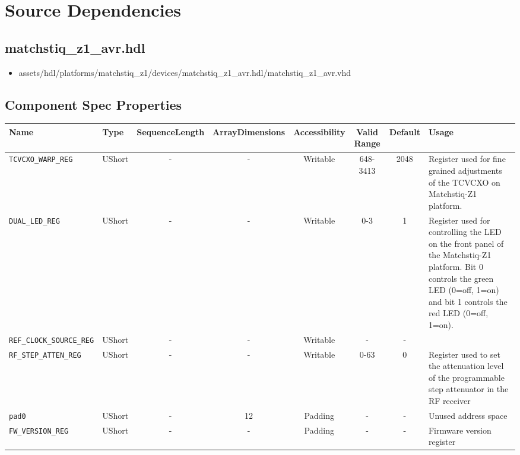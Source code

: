 \documentclass{article}
\def\comp{matchstiq\_z1\_avr}
\begin{document}
\section*{Source Dependencies}
\subsection*{\comp.hdl}
\begin{itemize}
	\item assets/hdl/platforms/matchstiq\_z1/devices/\comp.hdl/\comp.vhd
\end{itemize}

\begin{landscape}
\section*{Component Spec Properties}
\begin{scriptsize}
		\begin{tabular}{|p{4cm}|p{1cm}|c|c|c|c|c|p{7cm}|}
			\hline
			\rowcolor{blue}
			Name               & Type   & SequenceLength & ArrayDimensions   & Accessibility       & Valid Range                                                                      & Default & Usage                                                                        \\
			\hline
			\verb+TCVCXO_WARP_REG+          & UShort  & - & -  & Writable & 648-3413 & 2048     & Register used for fine grained adjustments of the TCVCXO on Matchstiq-Z1 platform. \\
			\hline
			\verb+DUAL_LED_REG+             & UShort  & - & -  & Writable & 0-3      & 1        & Register used for controlling the LED on the front panel of the Matchstiq-Z1 platform. Bit 0 controls the green LED (0=off, 1=on) and bit 1 controls the red LED (0=off, 1=on). \\
			\hline
			\verb+REF_CLOCK_SOURCE_REG+     & UShort  & - & -  & Writable & -        & -        & \\
			\hline
			\verb+RF_STEP_ATTEN_REG+        & UShort  & - & -  & Writable & 0-63     & 0        & Register used to set the attenuation level of the programmable step attenuator in the RF receiver \\
			\hline
			\verb+pad0+                     & UShort  & - & 12 & Padding  & -        & -        & Unused address space \\
			\hline
			\verb+FW_VERSION_REG+           & UShort  & - & -  & Padding  & -        & -        & Firmware version register \\

\end{tabular}
\end{scriptsize}
\end{landscape}
\end{document}
